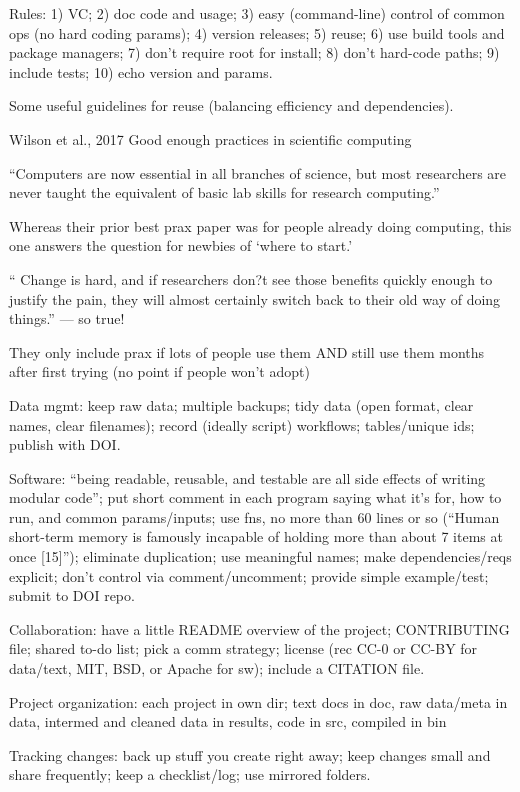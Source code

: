 \documentclass[12pt]{amsart}
\begin{document}
Rules: 1) VC; 2) doc code and usage; 3) easy (command-line) control of common ops (no hard coding params); 4) version releases; 5) reuse; 6) use build tools and package managers; 7) don't require root for install; 8) don't hard-code paths; 9) include tests; 10) echo version and params.

Some useful guidelines for reuse (balancing efficiency and dependencies).




Wilson et al., 2017 Good enough practices in scientific computing

``Computers are now essential in all branches of science, but most researchers are never taught the equivalent of basic lab skills for research computing.''

Whereas their prior best prax paper was for people already doing computing, this one answers the question for newbies of `where to start.' 

`` Change is hard, and if researchers don?t see those benefits quickly enough to justify the pain, they will almost certainly switch back to their old way of doing things.'' --- so true!

They only include prax if lots of people use them AND still use them months after first trying (no point if people won't adopt)

Data mgmt: keep raw data; multiple backups; tidy data (open format, clear names, clear filenames); record (ideally script) workflows; tables/unique ids; publish with DOI.

Software: ``being readable, reusable, and testable are all side effects of writing modular code''; put short comment in each program saying what it's for, how to run, and common params/inputs; use fns, no more than 60 lines or so (``Human short-term memory is famously incapable of holding more than about 7 items at once [15]''); eliminate duplication; use meaningful names; make dependencies/reqs explicit; don't control via comment/uncomment; provide simple example/test; submit to DOI repo.

Collaboration: have a little README overview of the project; CONTRIBUTING file; shared to-do list; pick a comm strategy; license (rec CC-0 or CC-BY for data/text, MIT, BSD, or Apache for sw); include a CITATION file.

Project organization: each project in own dir; text docs in doc, raw data/meta in data, intermed and cleaned data in results, code in src, compiled in bin

Tracking changes: back up stuff you create right away; keep changes small and share frequently; keep a checklist/log; use mirrored folders.
\end{document}
